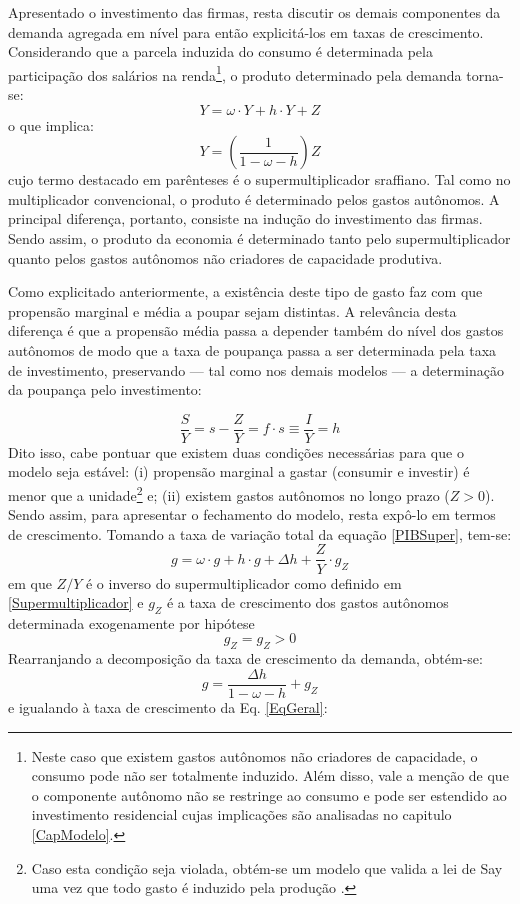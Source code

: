 Apresentado o investimento das firmas, resta discutir os demais componentes da demanda agregada em nível para então explicitá-los em taxas de crescimento.
Considerando que a parcela induzida do consumo é determinada pela participação dos salários  na renda\footnote{Neste caso que existem gastos autônomos não criadores de capacidade, o consumo pode não ser totalmente induzido. Além disso, vale a menção de que o componente autônomo não se restringe ao consumo e pode ser estendido ao investimento residencial cujas implicações são analisadas no capitulo \ref{CapModelo}.}, o produto determinado pela demanda torna-se:
\begin{equation}
\label{PIBSuper}
Y = \omega\cdot Y + h\cdot Y + Z
\end{equation}
o que implica:
\begin{equation}
\label{Supermultiplicador}
Y = \left(\frac{1}{1 - \omega - h}\right)Z
\end{equation}
cujo termo destacado em parênteses é o supermultiplicador sraffiano. Tal como no multiplicador convencional, o produto é determinado pelos gastos autônomos.
A principal diferença, portanto, consiste
na indução do investimento das firmas. 
Sendo assim, o produto da economia é determinado tanto pelo supermultiplicador quanto pelos gastos autônomos não criadores de capacidade produtiva.


Como explicitado anteriormente, a existência deste tipo de gasto faz com que propensão marginal e média a poupar sejam distintas. A relevância desta diferença é que a propensão média passa a depender também do nível dos gastos autônomos
de modo que a taxa de poupança passa a ser determinada pela taxa de investimento, preservando --- tal como nos demais modelos --- a determinação da poupança pelo investimento:


\begin{equation}
\label{frac_h}
\frac{S}{Y} = s - \frac{Z}{Y} = f\cdot s \equiv \frac{I}{Y} = h
\end{equation}
Dito isso, cabe pontuar que  existem duas condições necessárias para que o modelo seja estável: (i) propensão marginal a gastar (consumir e investir) é menor que a unidade\footnote{
	Caso esta condição seja violada, obtém-se um modelo que valida a lei de Say uma vez que todo gasto é induzido pela produção \cite[p.~ 75]{serrano_sraffian_1995}.} e; (ii) existem gastos autônomos no longo prazo ($Z > 0$).
Sendo assim, para apresentar o fechamento do modelo, resta expô-lo em termos de crescimento.
Tomando a taxa de variação total da equação \ref{PIBSuper}, tem-se:
$$
g = \omega\cdot g + h\cdot g + \Delta h + \frac{Z}{Y}\cdot  g_Z
$$
em que $Z/Y$ é o inverso do supermultiplicador como definido em \ref{Supermultiplicador} e $g_Z$ é a taxa de crescimento dos gastos autônomos determinada exogenamente por hipótese
$$
g_Z =  g_Z > 0
$$
Rearranjando a decomposição da taxa de crescimento da demanda, obtém-se:
\begin{equation}
\label{crescimentosuper}
g = \frac{\Delta h}{1 - \omega - h} +  g_Z
\end{equation}
e igualando à taxa de crescimento da Eq. \ref{EqGeral}:


